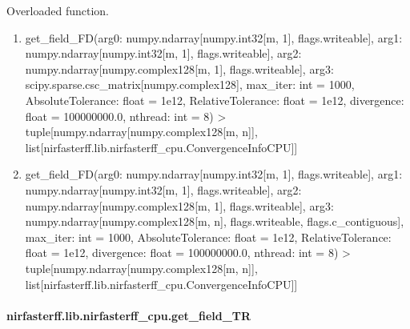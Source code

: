 \documentclass[letterpaper,10pt,english]{sphinxmanual}
\begin{document}
\begin{fulllineitems}
\label{\detokenize{_autosummary/nirfasterff.lib.nirfasterff_cpu.get_field_FD:nirfasterff.lib.nirfasterff_cpu.get_field_FD}}
\pysigstartsignatures
\pysiglinewithargsret
{}
{\sphinxparamcomma {}}
{}
\pysigstopsignatures
\sphinxAtStartPar
Overloaded function.
\begin{enumerate}
%
\item {} 
\sphinxAtStartPar
get\_field\_FD(arg0: numpy.ndarray{[}numpy.int32{[}m, 1{]}, flags.writeable{]}, arg1: numpy.ndarray{[}numpy.int32{[}m, 1{]}, flags.writeable{]}, arg2: numpy.ndarray{[}numpy.complex128{[}m, 1{]}, flags.writeable{]}, arg3: scipy.sparse.csc\_matrix{[}numpy.complex128{]}, max\_iter: int = 1000, AbsoluteTolerance: float = 1e\sphinxhyphen{}12, RelativeTolerance: float = 1e\sphinxhyphen{}12, divergence: float = 100000000.0, nthread: int = 8) \sphinxhyphen{}\textgreater{} tuple{[}numpy.ndarray{[}numpy.complex128{[}m, n{]}{]}, list{[}nirfasterff.lib.nirfasterff\_cpu.ConvergenceInfoCPU{]}{]}

\item {} 
\sphinxAtStartPar
get\_field\_FD(arg0: numpy.ndarray{[}numpy.int32{[}m, 1{]}, flags.writeable{]}, arg1: numpy.ndarray{[}numpy.int32{[}m, 1{]}, flags.writeable{]}, arg2: numpy.ndarray{[}numpy.complex128{[}m, 1{]}, flags.writeable{]}, arg3: numpy.ndarray{[}numpy.complex128{[}m, n{]}, flags.writeable, flags.c\_contiguous{]}, max\_iter: int = 1000, AbsoluteTolerance: float = 1e\sphinxhyphen{}12, RelativeTolerance: float = 1e\sphinxhyphen{}12, divergence: float = 100000000.0, nthread: int = 8) \sphinxhyphen{}\textgreater{} tuple{[}numpy.ndarray{[}numpy.complex128{[}m, n{]}{]}, list{[}nirfasterff.lib.nirfasterff\_cpu.ConvergenceInfoCPU{]}{]}

\end{enumerate}

\end{fulllineitems}


\sphinxstepscope


\paragraph{nirfasterff.lib.nirfasterff\_cpu.get\_field\_TR}
\label{\detokenize{_autosummary/nirfasterff.lib.nirfasterff_cpu.get_field_TR:nirfasterff-lib-nirfasterff-cpu-get-field-tr}}\label{\detokenize{_autosummary/nirfasterff.lib.nirfasterff_cpu.get_field_TR::doc}}
\end{document}
